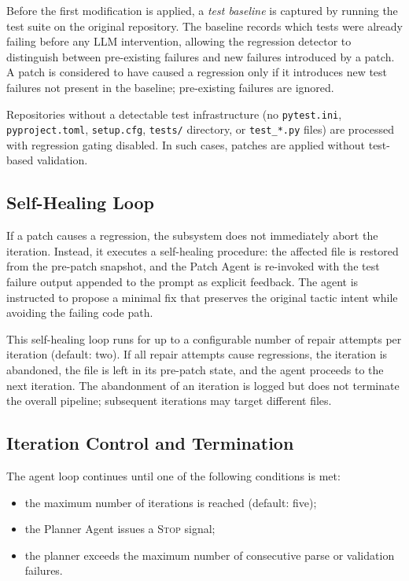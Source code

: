 Before the first modification is applied, a \textit{test baseline} is captured by running the test suite on the original repository. The baseline records which tests were already failing before any LLM intervention, allowing the regression detector to distinguish between pre-existing failures and new failures introduced by a patch. A patch is considered to have caused a regression only if it introduces new test failures not present in the baseline; pre-existing failures are ignored.

Repositories without a detectable test infrastructure (no \texttt{pytest.ini}, \texttt{pyproject.toml}, \texttt{setup.cfg}, \texttt{tests/} directory, or \texttt{test\_*.py} files) are processed with regression gating disabled. In such cases, patches are applied without test-based validation.

\subsection{Self-Healing Loop}
\label{subsec:impl_selfheal}

If a patch causes a regression, the subsystem does not immediately abort the iteration. Instead, it executes a self-healing procedure: the affected file is restored from the pre-patch snapshot, and the Patch Agent is re-invoked with the test failure output appended to the prompt as explicit feedback. The agent is instructed to propose a minimal fix that preserves the original tactic intent while avoiding the failing code path.

This self-healing loop runs for up to a configurable number of repair attempts per iteration (default: two). If all repair attempts cause regressions, the iteration is abandoned, the file is left in its pre-patch state, and the agent proceeds to the next iteration. The abandonment of an iteration is logged but does not terminate the overall pipeline; subsequent iterations may target different files.

\subsection{Iteration Control and Termination}
\label{subsec:impl_control}

The agent loop continues until one of the following conditions is met:

\begin{itemize}[nosep]
    \item the maximum number of iterations is reached (default: five);
    \item the Planner Agent issues a \textsc{Stop} signal;
    \item the planner exceeds the maximum number of consecutive parse or validation failures.
\end{itemize}

